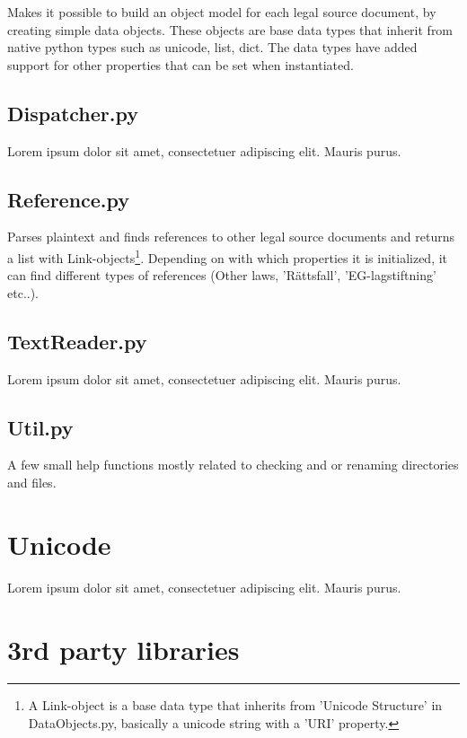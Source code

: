 \documentclass[a4paper,11pt]{kth-mag}
\begin{document}
Makes it possible to build an object model for each legal source document, by
creating simple data objects. These objects are base data types that inherit
from native python types such as unicode, list, dict. The data types have
added support for other properties that can be set when instantiated.

\subsection{Dispatcher.py}

Lorem ipsum dolor sit amet, consectetuer adipiscing elit. Mauris
purus. 

\subsection{Reference.py}

Parses plaintext and finds references to other legal source documents and
returns a list with Link-objects\footnote{A Link-object is a base data type
that inherits from 'Unicode Structure' in DataObjects.py, basically a unicode
string with a 'URI' property.}. Depending on with which properties it is
initialized, it can find different types of references (Other laws,
'Rättsfall', 'EG-lagstiftning' etc..).

\subsection{TextReader.py}

Lorem ipsum dolor sit amet, consectetuer adipiscing elit. Mauris
purus. 

\subsection{Util.py}

A few small help functions mostly related to checking and or renaming directories and files. 

\section{Unicode}

Lorem ipsum dolor sit amet, consectetuer adipiscing elit. Mauris
purus. 

\section{3rd party libraries}
\end{document}
